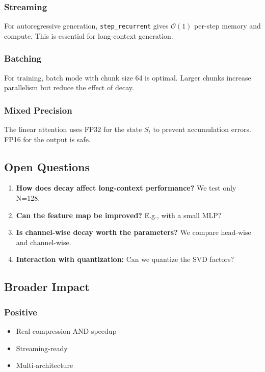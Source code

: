 \subsubsection{Streaming}

For autoregressive generation, \texttt{step\_recurrent} gives $\mathcal{O}(1)$ 
per-step memory and compute. This is essential for long-context generation.

\subsubsection{Batching}

For training, batch mode with chunk size 64 is optimal. Larger chunks 
increase parallelism but reduce the effect of decay.

\subsubsection{Mixed Precision}

The linear attention uses FP32 for the state $S_t$ to prevent accumulation 
errors. FP16 for the output is safe.

\subsection{Open Questions}

\begin{enumerate}
\item \textbf{How does decay affect long-context performance?} We test only N=128.
\item \textbf{Can the feature map be improved?} E.g., with a small MLP?
\item \textbf{Is channel-wise decay worth the parameters?} We compare head-wise
  and channel-wise.
\item \textbf{Interaction with quantization:} Can we quantize the SVD factors?

\end{enumerate}
\subsection{Broader Impact}

\subsubsection{Positive}
\begin{itemize}
\item Real compression AND speedup
\item Streaming-ready
\item Multi-architecture

\end{itemize}
